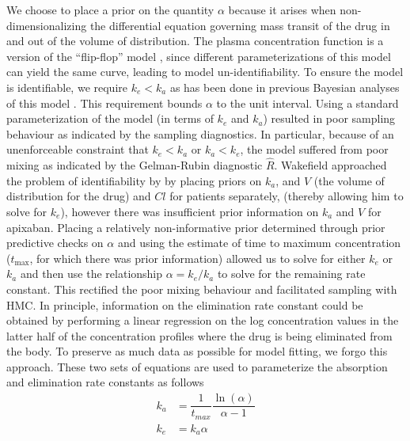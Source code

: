 \noindent We choose to place a prior on the quantity $\alpha$ because it arises when non-dimensionalizing \cite{holmes2009introduction} the differential equation governing mass transit of the drug in and out of the volume of distribution.  The plasma concentration function is a version of the “flip-flop” model \cite{Wakefield1996-yy, Salway2008-gi}, since different parameterizations of this model can yield the same curve, leading to model un-identifiability. To ensure the model is identifiable, we require $k_e<k_a$ as has been done in previous Bayesian analyses of this model \cite{Wakefield1996-yy, Salway2008-gi}. This requirement bounds $\alpha$ to the unit interval. Using a standard parameterization of the model (in terms of $k_e$ and $k_a$) resulted in poor sampling behaviour as indicated by the sampling diagnostics.  In particular, because of an unenforceable constraint that $k_e < k_a$ or $k_a < k_e$, the model suffered from poor mixing as indicated by the Gelman-Rubin diagnostic $\hat{R}$. Wakefield approached the problem of identifiability by \cite{wakefield1992bayesian} by placing priors on $k_a$, and $V$ (the volume of distribution for the drug) and $Cl$ for patients separately, (thereby allowing him to solve for $k_e$), however there was insufficient prior information on $k_a$ and $V$ for apixaban.
Placing a relatively non-informative prior determined through prior predictive checks on $\alpha$ and using the estimate of time to maximum concentration ($t_{\max}$, for which there was prior information) allowed us to solve for either $k_e$ or $k_a$ and then use the relationship $\alpha = k_e / k_a$ to solve for the remaining rate constant.  This rectified the poor mixing behaviour and facilitated sampling with HMC.  In principle, information on the elimination rate constant could be obtained by performing a linear regression on the log concentration values in the latter half of the concentration profiles where the drug is being eliminated from the body. To preserve as much data as possible for model fitting, we forgo this approach.  These two sets of equations are used to parameterize the absorption and elimination rate constants as follows
\begin{align}
	k_a &= \dfrac{1}{t_{\mathit{max}}} \dfrac{\ln(\alpha)}{\alpha-1} \label{eq:eq_4} \\
	k_e &= k_a \alpha \label{eq:eq_5}
\end{align}

